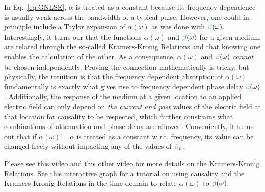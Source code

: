 In Eq.~\ref{eq:GNLSE}, $\alpha$ is treated as a constant because its frequency dependence is usually weak across the bandwidth of a typical pulse. However, one could in principle include a Taylor expansion of $\alpha(\omega)$ as was done with $\betag(\omega)$. Interestingly, it turns our that the functions $\alpha(\omega)$ and $\betag(\omega)$ for a given medium are related through the so-called \href{https://en.wikipedia.org/wiki/Kramers%E2%80%93Kronig_relations#Related_proof_from_the_time_domain}{Kramers-Kronig Relations} and that knowing one enables the calculation of the other. As a consequence, $\alpha(\omega)$ and $\betag(\omega)$ \emph{cannot} be chosen independently. Proving the connection mathematically is tricky, but physically, the intuition is that the frequency dependent absorption  of $\alpha(\omega)$ fundamentally is exactly what gives rise to frequency dependent phase delay $\betag(\omega)$. Additionally, the response of the medium at a given location to an applied electric field can only depend on \emph{the current and past} values of the electric field at that location for causality to be respected, which further constrains what combinations of attenuation and phase delay are allowed. Conveniently, it turns out that if $\alpha(\omega)=\alpha$ is treated as a constant w.r.t. frequency, its value can be changed freely without impacting any of the values of $\betag_n$.  

Please see \href{https://www.youtube.com/watch?v=vzBnsG2rKWs}{this video } and \href{https://www.youtube.com/watch?v=rFTUTxPHYYw}{this other video} for more details on the Kramers-Kronig Relations. See \href{https://www.desmos.com/calculator/1zymtgbbrv}{this interactive graph} for a tutorial on using causality and the Kramers-Kronig Relations in the time domain to relate $\alpha(\omega)$ to $\betag(\omega)$.

